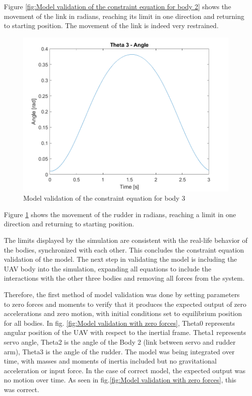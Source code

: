 Figure \ref{fig:Model validation of the constraint equation for body 2} shows the movement of the link in radians, reaching its limit in one direction and returning to starting position. The movement of the link is indeed very restrained.

\begin{figure}[H]
  \centering
  \includegraphics[scale=0.8]{graphics/Integration/theta3.png}
  \caption{Model validation of the constraint equation for body 3}
  \label{fig:Model validation of the constraint equation for body 3}
\end{figure}

Figure \ref{fig:Model validation of the constraint equation for body 3} shows the movement of the rudder in radians, reaching a limit in one direction and returning to starting position.   

The limits displayed by the simulation are consistent with the real-life behavior of the bodies, synchronized with each other. This concludes the constraint equation validation of the model. The next step in validating the model is including the UAV body into the simulation, expanding all equations to include the interactions with the other three bodies and removing all forces from the system.

Therefore, the first method of model validation was done by setting parameters to zero forces and moments to verify that it produces the expected output of zero accelerations and zero motion, with initial conditions set to equilibrium position for all bodies. 
In fig. \ref{fig:Model validation with zero forces}, Theta0 represents angular position of the UAV with respect to the inertial frame. Theta1 represents servo angle, Theta2 is the angle of the Body 2 (link between servo and rudder arm), Theta3 is the angle of the rudder. 
The model was being integrated over time, with masses and moments of inertia included but no gravitational acceleration or input force. In the case of correct model, the expected output was no motion over time. As seen in  fig.\ref{fig:Model validation with zero forces}, this was correct. 



